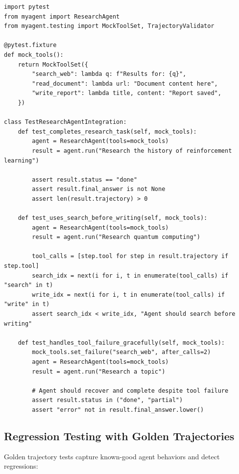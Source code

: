 \begin{lstlisting}[style=pythonstyle, caption={Integration testing with trajectory validation}]
import pytest
from myagent import ResearchAgent
from myagent.testing import MockToolSet, TrajectoryValidator

@pytest.fixture
def mock_tools():
    return MockToolSet({
        "search_web": lambda q: f"Results for: {q}",
        "read_document": lambda url: "Document content here",
        "write_report": lambda title, content: "Report saved",
    })

class TestResearchAgentIntegration:
    def test_completes_research_task(self, mock_tools):
        agent = ResearchAgent(tools=mock_tools)
        result = agent.run("Research the history of reinforcement learning")

        assert result.status == "done"
        assert result.final_answer is not None
        assert len(result.trajectory) > 0

    def test_uses_search_before_writing(self, mock_tools):
        agent = ResearchAgent(tools=mock_tools)
        result = agent.run("Research quantum computing")

        tool_calls = [step.tool for step in result.trajectory if step.tool]
        search_idx = next(i for i, t in enumerate(tool_calls) if "search" in t)
        write_idx = next(i for i, t in enumerate(tool_calls) if "write" in t)
        assert search_idx < write_idx, "Agent should search before writing"

    def test_handles_tool_failure_gracefully(self, mock_tools):
        mock_tools.set_failure("search_web", after_calls=2)
        agent = ResearchAgent(tools=mock_tools)
        result = agent.run("Research a topic")

        # Agent should recover and complete despite tool failure
        assert result.status in ("done", "partial")
        assert "error" not in result.final_answer.lower()
\end{lstlisting}

\subsection{Regression Testing with Golden Trajectories}
\label{regression-testing-with-golden-trajectories}

Golden trajectory tests capture known-good agent behaviors and detect regressions:

